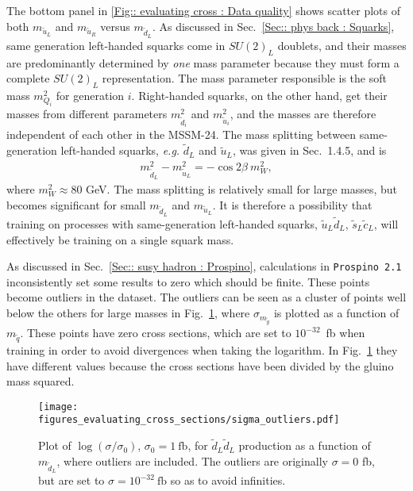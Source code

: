\documentclass[twoside,english]{uiofysmaster}
\begin{document}
{{The bottom panel in \autoref{Fig:: evaluating cross : Data quality} shows scatter plots of both $m_{\widetilde{u}_L}$ and $m_{\widetilde{u}_R}$ versus $m_{\widetilde{d}_L}$. As discussed in Sec.~\ref{Sec:: phys back : Squarks}, same generation left-handed squarks come in $SU(2)_L$ doublets, and their masses are predominantly determined by \textit{one} mass parameter because they must form a complete $SU(2)_L$ representation. The mass parameter responsible is the soft mass $m_{Q_i}^2$ for generation $i$.  Right-handed squarks, on the other hand, get their masses from different parameters $m_{\widetilde{d}_i}^2$ and $m_{\widetilde{u}_i}^2$, and the masses are therefore independent of each other in the MSSM-24. The mass splitting between same-generation left-handed squarks, \textit{e.g.} $\widetilde{d}_L$ and $\widetilde{u}_L$, was given in Sec.~1.4.5, and is
\begin{align*}
m_{\widetilde{d}_L}^2 - m_{\widetilde{u}_L}^2 = - \cos 2 \beta ~m_W^2,
\end{align*}
where $m_W^2 \approx 80$ GeV. The mass splitting is relatively small for large masses, but becomes significant for small $m_{\widetilde{d}_L}$ and $m_{\widetilde{u}_L}$. It is therefore a possibility that training on processes with same-generation left-handed squarks, $\widetilde{u}_L \widetilde{d}_L$, $\widetilde{s}_L \widetilde{c}_L$, will effectively be training on a single squark mass. 


As discussed in Sec.~\ref{Sec:: susy hadron : Prospino}, calculations in \verb|Prospino 2.1| inconsistently set some results to zero which should be finite. These points become outliers in the dataset. The outliers can be seen as a cluster of points well below the others for large masses in Fig.~\ref{Fig:: evaluating cross : sigma w outliers}, where $\sigma_{m_{\widetilde{g}}}$ is plotted as a function of $m_{\widetilde{q}}$. These points have zero cross sections, which are set to $10^{-32}$~fb when training in order to avoid divergences when taking the logarithm. In Fig.~\ref{Fig:: evaluating cross : sigma w outliers} they have different values because the cross sections have been divided by the gluino mass squared.

\begin{figure}
\centering
\texttt{[image: figures\_evaluating\_cross\_sections/sigma\_outliers.pdf]}
\caption{Plot of $\log( \sigma / \sigma_0)$, $\sigma_0 = 1~\mathrm{fb}$, for $\widetilde{d}_L \widetilde{d}_L$ production as a function of $m_{\widetilde{d}_L}$, where outliers are included. The outliers are originally $\sigma=0$ fb, but are set to $\sigma =10^{-32}~\mathrm{fb}$ so as to avoid infinities.}
\label{Fig:: evaluating cross : sigma w outliers}
\end{figure}


}}
\end{document}
